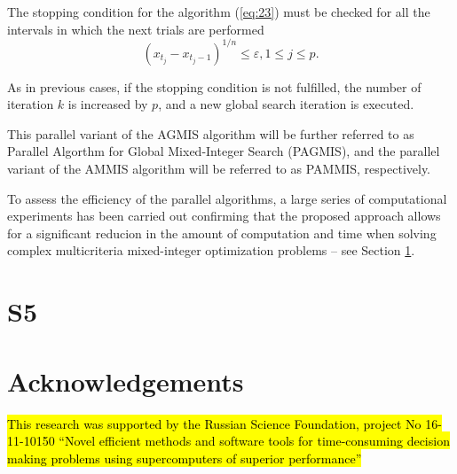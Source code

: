 \documentclass{svproc}
\begin{document}
The stopping condition for the algorithm (\ref{eq:23}) must be checked for all the intervals in which the next trials are performed
\begin{equation}\label{eq:26}
(x_{t_j} - x_{t_j-1})^{1/n} \leq \varepsilon, 1 \leq j \leq p. 
\end{equation}

As in previous cases, if the stopping condition is not fulfilled, the number of iteration $k$ is increased by $p$, and a new global search iteration is executed.
      
This parallel variant of the AGMIS algorithm will be further referred to as Parallel Algorthm for  Global Mixed-Integer Search (PAGMIS), and the parallel variant of the AMMIS algorithm will be referred to as PAMMIS, respectively.

To assess the efficiency of the parallel algorithms, a large series of computational experiments has been carried out confirming that the proposed approach allows for a significant reducion in the amount of computation and time when solving complex multicriteria mixed-integer optimization problems -- see Section \ref{sec:5}.








\section{S5}\label{sec:5}



\cite{c1,c2,c3,c4,c5,c6,c7,c8,c9,c10}
\cite{c11,c12,c13,c14,c15,c16,c17,c18,c19,c20}
\cite{c21,c22,c23,c24,c25,c26,c27,c28,c29,c30}
\cite{c31,c32,c33,c34,c35,c36,c37,c38,c39,c40}
\cite{c41,c42,c43,c44,c45}



\section*{Acknowledgements} 
\hl{This research was supported by the Russian Science Foundation, project No 16-11-10150 ``Novel efficient methods and software tools for time-consuming decision making problems using supercomputers of superior performance''}



%

\end{document}
